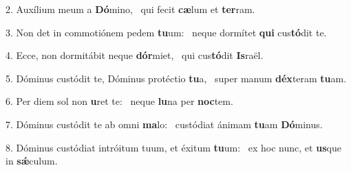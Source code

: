 2. Auxílium meum a \textbf{Dó}mino, \ast\  qui fecit \textbf{cæ}lum et \textbf{ter}ram.\

3. Non det in commotiónem pedem \textbf{tu}um: \ast\  neque dormítet \textbf{qui} cus\textbf{tó}dit te.\

4. Ecce, non dormitábit neque \textbf{dór}miet, \ast\  qui cus\textbf{tó}dit \textbf{Is}raël.\

5. Dóminus custódit te, Dóminus protéctio \textbf{tu}a, \ast\  super manum \textbf{déx}teram \textbf{tu}am.\

6. Per diem sol non \textbf{u}ret te: \ast\  neque \textbf{lu}na per \textbf{noc}tem.\

7. Dóminus custódit te ab omni \textbf{ma}lo: \ast\  custódiat ánimam \textbf{tu}am \textbf{Dó}minus.\

8. Dóminus custódiat intróitum tuum, et éxitum \textbf{tu}um: \ast\  ex hoc nunc, et \textbf{us}que in \textbf{sǽ}culum.\

